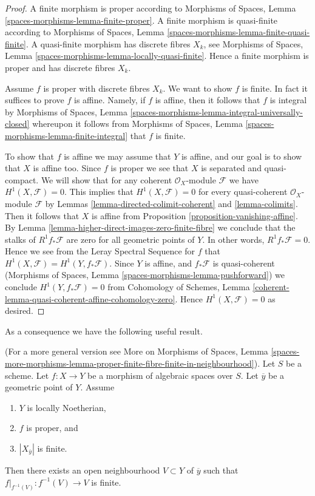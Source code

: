 \begin{proof}
A finite morphism is proper according to
Morphisms of Spaces, Lemma \ref{spaces-morphisms-lemma-finite-proper}.
A finite morphism is quasi-finite according to
Morphisms of Spaces, Lemma \ref{spaces-morphisms-lemma-finite-quasi-finite}.
A quasi-finite morphism has discrete fibres $X_k$, see
Morphisms of Spaces, Lemma \ref{spaces-morphisms-lemma-locally-quasi-finite}.
Hence a finite morphism is proper and has discrete fibres $X_k$.

\medskip\noindent
Assume $f$ is proper with discrete fibres $X_k$.
We want to show $f$ is finite.
In fact it suffices to prove $f$ is affine.
Namely, if $f$ is affine, then it follows that
$f$ is integral by
Morphisms of Spaces, Lemma
\ref{spaces-morphisms-lemma-integral-universally-closed}
whereupon it follows from
Morphisms of Spaces, Lemma \ref{spaces-morphisms-lemma-finite-integral}
that $f$ is finite.

\medskip\noindent
To show that $f$ is affine we may assume that $Y$ is affine, and our
goal is to show that $X$ is affine too.
Since $f$ is proper we see that $X$ is separated and quasi-compact.
We will show that for any coherent
$\mathcal{O}_X$-module $\mathcal{F}$ we have $H^1(X, \mathcal{F}) = 0$.
This implies that $H^1(X, \mathcal{F}) = 0$ for every quasi-coherent
$\mathcal{O}_X$-module $\mathcal{F}$ by
Lemmas \ref{lemma-directed-colimit-coherent} and \ref{lemma-colimits}.
Then it follows that $X$ is affine from
Proposition \ref{proposition-vanishing-affine}. By
Lemma \ref{lemma-higher-direct-images-zero-finite-fibre}
we conclude that the stalks of $R^1f_*\mathcal{F}$
are zero for all geometric points of $Y$.
In other words, $R^1f_*\mathcal{F} = 0$. Hence we see from
the Leray Spectral Sequence for $f$ that
$H^1(X , \mathcal{F}) = H^1(Y, f_*\mathcal{F})$.
Since $Y$ is affine, and $f_*\mathcal{F}$ is quasi-coherent
(Morphisms of Spaces, Lemma \ref{spaces-morphisms-lemma-pushforward})
we conclude $H^1(Y, f_*\mathcal{F}) = 0$
from
Cohomology of Schemes, Lemma
\ref{coherent-lemma-quasi-coherent-affine-cohomology-zero}.
Hence $H^1(X, \mathcal{F}) = 0$ as desired.
\end{proof}

\noindent
As a consequence we have the following useful result.

\begin{lemma}
\label{lemma-proper-finite-fibre-finite-in-neighbourhood}
(For a more general version see
More on Morphisms of Spaces, Lemma
\ref{spaces-more-morphisms-lemma-proper-finite-fibre-finite-in-neighbourhood}).
Let $S$ be a scheme. Let $f : X \to Y$ be a morphism of algebraic spaces
over $S$. Let $\overline{y}$ be a geometric point of $Y$.
Assume
\begin{enumerate}
\item $Y$ is locally Noetherian,
\item $f$ is proper, and
\item $|X_{\overline{y}}|$ is finite.
\end{enumerate}
Then there exists an open neighbourhood $V \subset Y$ of $\overline{y}$
such that $f|_{f^{-1}(V)} : f^{-1}(V) \to V$ is finite.
\end{lemma}

